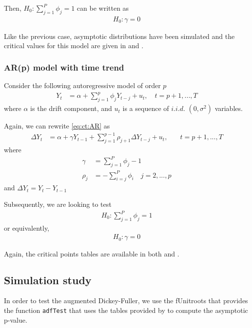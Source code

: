 \documentclass[11pt]{article}\usepackage[]{graphicx}\usepackage[]{color}
\newcommand{\pkg}[1]{{\normalfont\fontseries{b}\selectfont #1}}
\let\code=\texttt
\begin{document}
Then, $H_0: \sum_{j=1}^{P} \phi_{j}=1$ can be written as
\begin{align}
	H_0: \gamma=0
\end{align}

Like the previous case, asymptotic distributions have been simulated and the critical values for this model are given in \cite{banerjee_co-integration_1993} and \cite[Table 8.5.2]{fuller_introduction_1976}.

\subsubsection{AR(p) model with time trend}

Consider the following autoregressive model of order $p$
\begin{align}
	\label{eq:ct:AR}
	Y_t & = \alpha + \sum_{j=1}^{p} \phi_j Y_{t-j} + u_t, \quad t = p + 1, ... , T
\end{align}
where $\alpha$ is the drift component, and $u_t$ is a sequence of $i.i.d.$ $(0,\sigma^2)$ variables.

Again, we can rewrite \ref{eq:ct:AR} as
\begin{align}
	\Delta Y_t & =  \alpha + \gamma Y_{t-1} + \sum_{j=1}^{p-1}\rho_{j+1}\Delta Y_{t-j} + u_t, & \quad t = p + 1, ... , T
\end{align}
where
\begin{align}
	\gamma & =\sum_{j=1}^{P} \phi_{j} -1 \\
	\rho_j & = - \sum_{i=j}^{P} \phi_{i} \quad j = 2,...,p
\end{align}
and $\Delta Y_t= Y_{t}-Y_{t-1}$

Subsequently, we are looking to test
\begin{align}
	H_0: \sum_{j=1}^{P} \phi_{j} = 1
\end{align}
or equivalently,
\begin{align}
	H_0: \gamma=0
\end{align}

Again, the critical points tables are available in both \cite{banerjee_co-integration_1993} and \cite[Table 8.5.2]{fuller_introduction_1976}.


\subsection{Simulation study}

In order to test the augmented Dickey-Fuller, we use the \pkg{fUnitroots} \citep{wuertz_funitroots:_2013} that provides the function \code{adfTest} that uses the tables provided by \cite{banerjee_co-integration_1993} to compute the asymptotic p-value.
\end{document}
